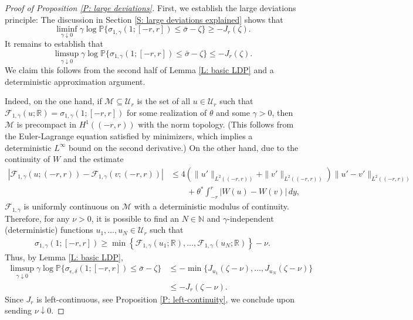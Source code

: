 \documentclass[12pt]{amsart}
\begin{document}
	\begin{proof}[Proof of Proposition \ref{P: large deviations}] First, we establish the large deviations principle: The discussion in Section \ref{S: large deviations explained} shows that 
    \begin{equation*}
        \liminf_{\gamma \downarrow 0 } \gamma \log \mathbb{P} \{ \sigma_{1,\gamma}(1;[-r,r]) \leq \bar{\sigma} - \zeta \} \geq - J_{r}(\zeta).
    \end{equation*}
    It remains to establish that
    \begin{equation*}
        \limsup_{\gamma \downarrow 0} \gamma \log \mathbb{P} \{ \sigma_{1,\gamma}(1;[-r,r]) \leq \bar{\sigma} - \zeta \} \leq - J_{r}(\zeta).
    \end{equation*}
   We claim this follows from the second half of Lemma \ref{L: basic LDP} and a deterministic approximation argument.
    
    Indeed, on the one hand, if $\mathcal{M} \subseteq \mathcal{U}_{r}$ is the set of all $u \in \mathcal{U}_{r}$ such that $\mathscr{F}_{1,\gamma}(u;\mathbb{R}) = \sigma_{1,\gamma}(1;[-r,r])$ for some realization of $\theta$ and some $\gamma > 0$, then $\mathcal{M}$ is precompact in $H^{1}((-r,r))$ with the norm topology.  (This follows from the Euler-Lagrange equation satisfied by minimizers, which implies a deterministic $L^{\infty}$ bound on the second derivative.)  On the other hand, due to the continuity of $W$ and the estimate 
        \begin{align*}
            | \mathscr{F}_{1,\gamma}(u;(-r,r)) - \mathscr{F}_{1,\gamma}(v;(-r,r)) | &\leq 4 ( \| u' \|_{L^{2}((-r,r))} + \|v'\|_{L^{2}((-r,r))} ) \| u' - v' \|_{L^{2}((-r,r))} \\
            &\qquad + \theta^{*} \int_{-r}^{r} | W(u) - W(v) | \, dy,
        \end{align*}
        $\mathscr{F}_{1,\gamma}$ is uniformly continuous on $\mathcal{M}$ with a deterministic modulus of continuity.  Therefore, for any $\nu > 0$, it is possible to find an $N \in \mathbb{N}$ and $\gamma$-independent (deterministic) functions $u_{1},\dots,u_{N} \in \mathcal{U}_{r}$ such that 
			\begin{align*}
				\sigma_{1,\gamma}(1; [-r,r]) \geq \min \left\{ \mathscr{F}_{1,\gamma}(u_{1};\mathbb{R}), \dots, \mathscr{F}_{1,\gamma}(u_{N};\mathbb{R}) \right\} - \nu.
			\end{align*}
        Thus, by Lemma \ref{L: basic LDP},
			\begin{align*}
				\limsup_{ \gamma \downarrow 0 } \gamma \log \mathbb{P} \{ \sigma_{\epsilon,\delta}(1;[-r,r]) \leq \bar{\sigma} - \zeta \} &\leq - \min \{ J_{u_{1}}(\zeta - \nu),\dots,J_{u_{N}}(\zeta - \nu) \} \\
                &\leq - J_{r}(\zeta - \nu).
			\end{align*}
        Since $J_{r}$ is left-continuous, see Proposition \ref{P: left-continuity}, we conclude upon sending $\nu \downarrow 0$.
			

\end{proof}
\end{document}
